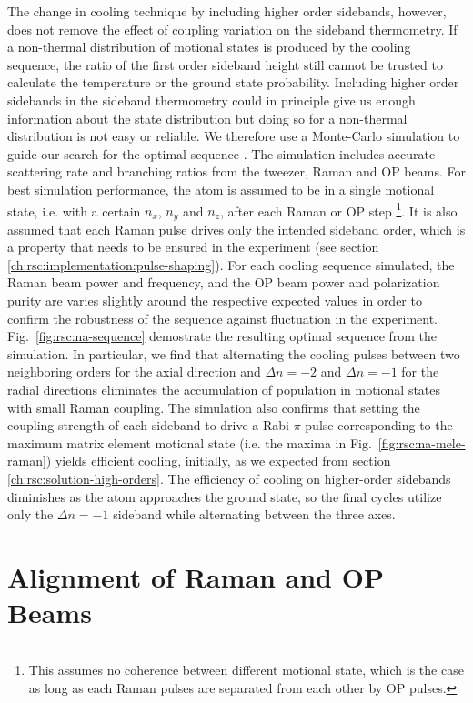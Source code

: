 The change in cooling technique by including higher order sidebands, however,
does not remove the effect of coupling variation on the sideband thermometry.
If a non-thermal distribution of motional states is produced by the cooling sequence,
the ratio of the first order sideband height still cannot be trusted to calculate
the temperature or the ground state probability.
Including higher order sidebands in the sideband thermometry could in principle
give us enough information about the state distribution but doing
so for a non-thermal distribution is not easy or reliable.
We therefore use a Monte-Carlo simulation to guide our search
for the optimal sequence \cite{dalibard_wave-function_1992}.
The simulation includes accurate scattering rate and branching ratios
from the tweezer, Raman and OP beams.
For best simulation performance, the atom is assumed to be in a single motional state,
i.e. with a certain $n_x$, $n_y$ and $n_z$, after each Raman or OP step
\footnote{This assumes no coherence between different motional state,
  which is the case as long as each Raman pulses are separated from each other by OP pulses.}.
It is also assumed that each Raman pulse drives only the intended sideband order,
which is a property that needs to be ensured in the experiment
(see section \ref{ch:rsc:implementation:pulse-shaping}).
For each cooling sequence simulated,
the Raman beam power and frequency, and the OP beam power and polarization purity
are varies slightly around the respective expected values
in order to confirm the robustness of the sequence against fluctuation in the experiment.
Fig.~\ref{fig:rsc:na-sequence} demostrate the resulting optimal sequence from the simulation.
In particular, we find that alternating the cooling pulses between two
neighboring orders for the axial direction and $\Delta n=-2$ and $\Delta n=-1$
for the radial directions
eliminates the accumulation of population in motional states with small Raman coupling.
The simulation also confirms that setting the coupling strength of each sideband
to drive a Rabi $\pi$-pulse corresponding to the maximum matrix element motional state
(i.e. the maxima in Fig.~\ref{fig:rsc:na-mele-raman}) yields efficient cooling, initially,
as we expected from section \ref{ch:rsc:solution-high-orders}.
The efficiency of cooling on higher-order sidebands diminishes
as the atom approaches the ground state, so the final cycles utilize only
the $\Delta n=-1$ sideband while alternating between the three axes.

\section{Alignment of Raman and OP Beams}
\label{ch:rsc:alignment}

